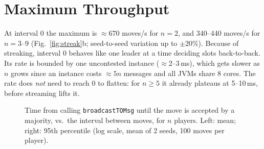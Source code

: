 \documentclass[11pt]{article}
\begin{document}
\section{Maximum Throughput}
At interval 0 the maximum is $\approx$670 moves/s for $n=2$, and 340--440 moves/s for $n=3$--9 (Fig.~\ref{fig:streak}b; seed-to-seed variation up to $\pm$20\%). Because of streaking, interval 0 behaves like one leader at a time deciding slots back-to-back. Its rate is bounded by one uncontested instance ($\approx$2--3\,ms), which gets slower as $n$ grows since an instance costs $\approx5n$ messages and all JVMs share 8 cores. The rate does \emph{not} need to reach 0 to flatten: for $n\ge5$ it already plateaus at 5--10\,ms, before streaming lifts it.


\clearpage
\begin{figure}[t]
\centering
\begin{minipage}{0.49\linewidth}
\end{minipage}\hfill
\begin{minipage}{0.49\linewidth}
\end{minipage}
\caption{Time from calling \texttt{broadcastTOMsg} until the move is accepted by a majority, vs.\ the interval between moves, for $n$ players. Left: mean; right: 95th percentile (log scale, mean of 2 seeds, 100 moves per player).}
\label{fig:lat}
\end{figure}
\end{document}
